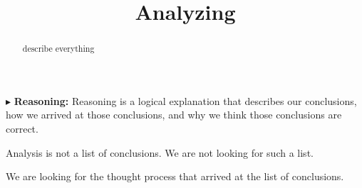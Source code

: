\documentclass{ximera}
\title{Analyzing}
\begin{document}
\begin{abstract}
describe everything
\end{abstract}
\maketitle







$\blacktriangleright$ \textbf{\textcolor{red!70!black}{Reasoning:}} Reasoning is a logical explanation that describes our conclusions, how we arrived at those conclusions, and why we think those conclusions are correct. 

Analysis is not a list of conclusions. We are not looking for such a list. 

We are looking for the thought process that arrived at the list of conclusions. 
\end{document}
